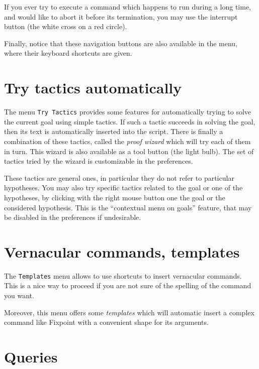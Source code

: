 If you ever try to execute a command which happens to run during a
long time, and would like to abort it before its
termination, you may use the interrupt button (the white cross on a red circle).
 
Finally, notice that these navigation buttons are also available in
the menu, where their keyboard shortcuts are given.

\section{Try tactics automatically}
\label{sec:trytactics}

The menu \texttt{Try Tactics} provides some features for automatically
trying to solve the current goal using simple tactics. If such a
tactic succeeds in solving the goal, then its text is automatically
inserted into the script. There is finally a combination of these
tactics, called the \emph{proof wizard} which will try each of them in
turn. This wizard is also available as a tool button (the light
bulb).  The set of tactics tried by the wizard is customizable in
the preferences.

These tactics are general ones, in particular they do not refer to
particular hypotheses. You may also try specific tactics related to
the goal or one of the hypotheses, by clicking with the right mouse
button one the goal or the considered hypothesis. This is the
``contextual menu on goals'' feature, that may be disabled in the
preferences if undesirable.
 
\section{Vernacular commands, templates}

The \texttt{Templates} menu allows to use shortcuts to insert
vernacular commands. This is a nice way to proceed if you are not sure
of the spelling of the command you want.

Moreover, this menu offers some \emph{templates} which will automatic
insert a complex command like Fixpoint with a convenient shape for its
arguments. 

\section{Queries}

